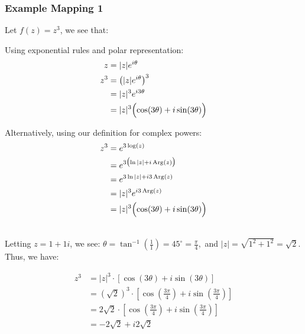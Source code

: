 \documentclass[a4paper,12pt]{article} %
\theoremstyle{definition}
\theoremstyle{plain}
\begin{document}
\subsubsection{Example Mapping 1}
Let \( f(z) = z^3 \), we see that: \\[1ex]
\begin{minipage}{0.47\textwidth}
Using exponential rules and polar representation:
  \begin{align*}
    z &= |z|e^{i\theta} \\
    z^3 &= \bigl(|z|e^{i\theta}\bigr)^3 \\
         &= |z|^3 e^{i3\theta} \\
         &= |z|^3 \Bigl(\cos(3\theta) + i\sin(3\theta)\Bigr)
  \end{align*}
\end{minipage}\hfill
\begin{minipage}{0.47\textwidth}
Alternatively, using our definition for complex powers:
  \begin{align*}
    z^3 &= e^{3\log(z)} \\
         &= e^{3\bigl(\ln|z| + i\,\mathrm{Arg}(z)\bigr)} \\
         &= e^{3\ln|z| + i3\,\mathrm{Arg}(z)} \\
         &= |z|^3 e^{i3\,\mathrm{Arg}(z)} \\
         &= |z|^3 \Bigl(\cos(3\theta) + i\sin(3\theta)\Bigr)
  \end{align*}
\end{minipage}\hfill\\[1ex]
Letting $z = 1 + 1i$, we see:
$\theta = \tan^{-1}\left(\frac{1}{1}\right) = 45^\circ = \frac{\pi}{4},$
and $|z| = \sqrt{1^2 + 1^2} = \sqrt{2}$.  Thus, we have: \\
\begin{minipage}{0.47\textwidth}
\begin{align*}
  z^3 &= |z|^3\cdot \left[\cos(3\theta) + i\sin(3\theta)\right] \\
      &= (\sqrt{2})^3\cdot \left[\cos\left(\frac{3\pi}{4}\right) + i\sin\left(\frac{3\pi}{4}\right)\right] \\
      &= 2\sqrt{2}\cdot \left[\cos\left(\frac{3\pi}{4}\right) + i\sin\left(\frac{3\pi}{4}\right)\right] \\
      &= -2\sqrt{2} + i 2\sqrt{2}
\end{align*}
\end{minipage}\hfill
\end{document}
